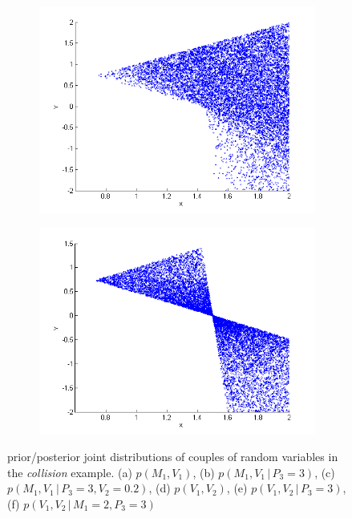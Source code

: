 \documentclass[letterpaper]{article}
\newcommand{\pr}{p}
\newcommand{\nn}{0.16}
\begin{document}
\begin{figure}
\begin{center}
\begin{subfigure}[b]{\nn\textwidth}
                \includegraphics[width=1\textwidth]{Figs/col_v1v2whenPis3.png}
                \caption{}
                \label{fig:mom2}
        \end{subfigure}%
\begin{subfigure}[b]{\nn\textwidth}
                \includegraphics[width=1\textwidth]{Figs/colV1V2givenPis3M1is2.png}
                \caption{}
                \label{fig:mom2}
        \end{subfigure}%
\end{center}
\vspace{-1mm}
\caption{\footnotesize
prior/posterior joint distributions of couples of random variables in the \emph{collision} example. 
(a) $\pr(M_1, V_1)$,
(b) $\pr(M_1, V_1 \, | \, P_3 = 3)$,
(c) $\pr(M_1, V_1 \, | \, P_3 = 3, V_2 = 0.2)$,
(d) $\pr(V_1, V_2)$,
(e) $\pr(V_1, V_2 \, | \, P_3 = 3)$,
(f) $\pr(V_1, V_2 \, | \, M_1 =2, P_3 = 3)$
} 
\label{fig:mom}
\end{figure}
\end{document}

